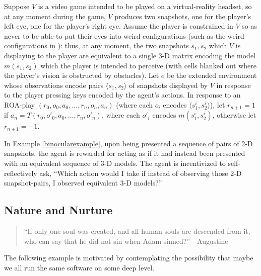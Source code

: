 \documentclass[runningheads]{llncs}
\begin{document}
\begin{example}
\label{binocularexample}
    Suppose $V$ is a video game intended to be played on a virtual-reality headset,
    so at any moment during the game, $V$ produces two snapshots, one for the player's
    left eye, one for the player's right eye. Assume the player is constrained in $V$
    so as never to be able to put their eyes into weird configurations (such as
    the weird configurations in
    \cite{gallagher2020third}): thus, at any moment, the two snapshots $s_1,s_2$
    which $V$ is
    displaying to the player are equivalent to a single 3-D matrix encoding
    the model $m(s_1,s_2)$ which the player is intended to perceive (with cells blanked
    out where the player's vision is obstructed by obstacles). Let $e$ be the extended
    environment whose observations encode pairs $\langle s_1,s_2\rangle$ of snapshots
    displayed by $V$ in response to the player pressing keys encoded by the agent's
    actions. In response to an ROA-play $(r_0,o_0,a_0,\ldots,r_n,o_n,a_n)$ (where
    each $o_i$ encodes $\langle s^i_1,s^i_2\rangle$), let $r_{n+1}=1$ if
    $a_n=T(r_0,o'_0,a_0,\ldots,r_n,o'_n)$, where each $o'_i$ encodes
    $m(s^i_1,s^i_2)$, otherwise let $r_{n+1}=-1$.
\end{example}

In Example \ref{binocularexample}, upon being presented a sequence of pairs of 2-D snapshots,
the agent is rewarded for acting as if it had instead been presented with an equivalent
sequence of 3-D models.
The agent is incentivized to self-reflectively ask, ``Which action would I take if instead
of observing those 2-D snapshot-pairs, I observed equivalent 3-D models?''

\subsection{Nature and Nurture}

\begin{quote}
    ``If only one soul was created, and all human souls are descended from it,
    who can say that he did not sin when Adam sinned?''---Augustine \cite{augustine1993free}
\end{quote}

The following example is motivated by contemplating the possibility that maybe we all
run the same software on some deep level.
\end{document}
